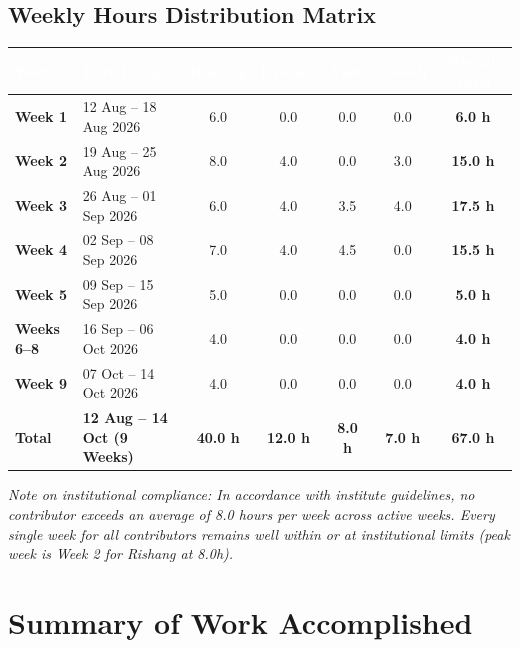\documentclass[11pt,a4paper]{article}
\begin{document}
\subsection*{Weekly Hours Distribution Matrix}
\begin{table}[h]
\centering
\small
\renewcommand{\arraystretch}{1.15}
\begin{tabular}{llccccc}
\toprule
\rowcolor{primary}
\textcolor{white}{\textbf{Week}} & \textcolor{white}{\textbf{Date Range}} & \textcolor{white}{\textbf{Rishang}} & \textcolor{white}{\textbf{Krishna}} & \textcolor{white}{\textbf{Yash}} & \textcolor{white}{\textbf{Lokesh}} & \textcolor{white}{\textbf{Weekly Total}} \\
\midrule
\textbf{Week 1} & 12 Aug -- 18 Aug 2026 & 6.0 & 0.0 & 0.0 & 0.0 & \textbf{6.0 h} \\
\rowcolor{lightbg}
\textbf{Week 2} & 19 Aug -- 25 Aug 2026 & 8.0 & 4.0 & 0.0 & 3.0 & \textbf{15.0 h} \\
\textbf{Week 3} & 26 Aug -- 01 Sep 2026 & 6.0 & 4.0 & 3.5 & 4.0 & \textbf{17.5 h} \\
\rowcolor{lightbg}
\textbf{Week 4} & 02 Sep -- 08 Sep 2026 & 7.0 & 4.0 & 4.5 & 0.0 & \textbf{15.5 h} \\
\textbf{Week 5} & 09 Sep -- 15 Sep 2026 & 5.0 & 0.0 & 0.0 & 0.0 & \textbf{5.0 h} \\
\rowcolor{lightbg}
\textbf{Weeks 6--8} & 16 Sep -- 06 Oct 2026 & 4.0 & 0.0 & 0.0 & 0.0 & \textbf{4.0 h} \\
\textbf{Week 9} & 07 Oct -- 14 Oct 2026 & 4.0 & 0.0 & 0.0 & 0.0 & \textbf{4.0 h} \\
\midrule
\rowcolor{secondary!15}
\textbf{Total} & \textbf{12 Aug -- 14 Oct (9 Weeks)} & \textbf{40.0 h} & \textbf{12.0 h} & \textbf{8.0 h} & \textbf{7.0 h} & \textbf{67.0 h} \\
\bottomrule
\end{tabular}
\end{table}

\textit{Note on institutional compliance: In accordance with institute guidelines, no contributor exceeds an average of 8.0 hours per week across active weeks. Every single week for all contributors remains well within or at institutional limits (peak week is Week 2 for Rishang at 8.0h).}

\section{Summary of Work Accomplished}
\end{document}
